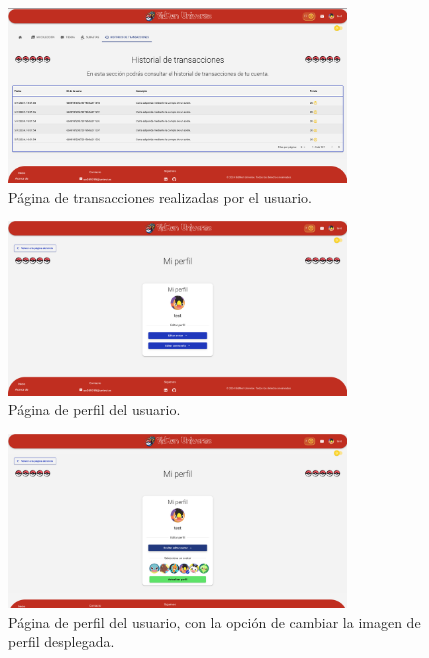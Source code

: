 \begin{figure}[H]
    \centering
    \includegraphics[width=0.8\textwidth]{figures/6-Analisis/6-Interfaz/interfaz/transacciones.png}
    \caption{Página de transacciones realizadas por el usuario.}
    \label{fig:interfaz-transacciones}
\end{figure}

\begin{figure}[H]
    \centering
    \includegraphics[width=0.8\textwidth]{figures/6-Analisis/6-Interfaz/interfaz/perfil1.png}
    \caption{Página de perfil del usuario.}
    \label{fig:interfaz-perfil1}
\end{figure}


\begin{figure}[H]
    \centering
    \includegraphics[width=0.8\textwidth]{figures/6-Analisis/6-Interfaz/interfaz/perfil2.png}
    \caption{Página de perfil del usuario, con la opción de cambiar la imagen de perfil desplegada.}
    \label{fig:interfaz-perfil2}
\end{figure}


